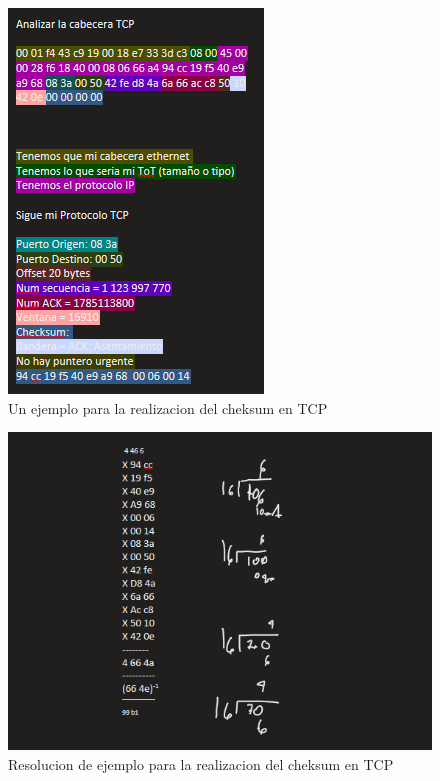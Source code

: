 	\begin{figure}[h]
			\centering		
			\includegraphics[width=\textwidth]{EjemploPTCP}
			\caption{Un ejemplo para la realizacion del cheksum en TCP}
	\end{figure}
	\begin{figure}[h]
			\centering		
			\includegraphics[width=\textwidth]{ResolucionTCP}
			\caption{Resolucion de ejemplo para la realizacion del cheksum en TCP}
	\end{figure}
\clearpage
